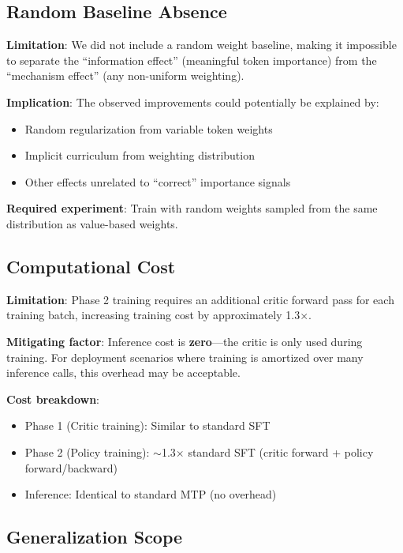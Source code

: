 \subsection{Random Baseline Absence}

\textbf{Limitation}: We did not include a random weight baseline, making it impossible to separate the ``information effect'' (meaningful token importance) from the ``mechanism effect'' (any non-uniform weighting).

\textbf{Implication}: The observed improvements could potentially be explained by:
\begin{itemize}[nosep]
    \item Random regularization from variable token weights
    \item Implicit curriculum from weighting distribution
    \item Other effects unrelated to ``correct'' importance signals
\end{itemize}

\textbf{Required experiment}: Train with random weights sampled from the same distribution as value-based weights.

\subsection{Computational Cost}

\textbf{Limitation}: Phase 2 training requires an additional critic forward pass for each training batch, increasing training cost by approximately 1.3$\times$.

\textbf{Mitigating factor}: Inference cost is \textbf{zero}---the critic is only used during training. For deployment scenarios where training is amortized over many inference calls, this overhead may be acceptable.

\textbf{Cost breakdown}:
\begin{itemize}[nosep]
    \item Phase 1 (Critic training): Similar to standard SFT
    \item Phase 2 (Policy training): $\sim$1.3$\times$ standard SFT (critic forward + policy forward/backward)
    \item Inference: Identical to standard MTP (no overhead)
\end{itemize}

\subsection{Generalization Scope}

